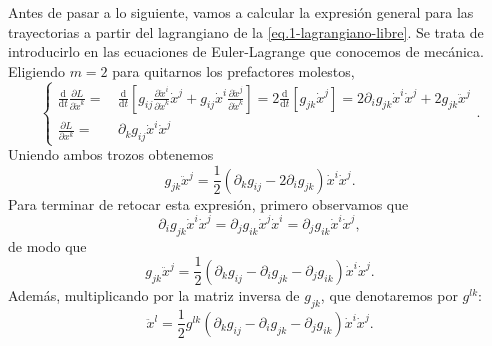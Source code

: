 Antes de pasar a lo siguiente, vamos a calcular la expresión general para las trayectorias a partir del lagrangiano de la \cref{eq.1-lagrangiano-libre}. Se trata de introducirlo en las ecuaciones de Euler-Lagrange que conocemos de mecánica. Eligiendo \(m = 2\) para quitarnos los prefactores molestos,
\begin{equation*}
    \left\{
        \begin{aligned}
            \frac{\mathrm{d}}{\mathrm{d}t}\frac{\partial L}{\partial \dot{x}^{k}} =&\, 
            \frac{\mathrm{d}}{\mathrm{d}t} \left[g_{ij} \frac{\partial \dot{x}^i}{\partial \dot{x}^k} \dot{x}^j +  g_{ij} \dot{x}^i\frac{\partial \dot{x}^j}{\partial \dot{x}^k} \right] = 2\frac{\mathrm{d}}{\mathrm{d}t} \left[g_{jk} \dot{x}^j\right]
            = 2 \partial_i g_{jk} \dot{x}^i \dot{x}^j + 2 g_{jk} \ddot{x}^j\\
            \frac{\partial L}{\partial x^k} =&\, \partial_{k}g_{ij}\dot{x}^i\dot{x}^j
        \end{aligned}
    \right..
\end{equation*}
Uniendo ambos trozos obtenemos
\begin{equation}
    g_{jk} \ddot{x}^j = \frac{1}{2}\left(\partial_{k}g_{ij} - 2 \partial_i g_{jk}\right)\dot{x}^i\dot{x}^j.
\end{equation}
Para terminar de retocar esta expresión, primero observamos que 
\begin{equation*}
    \partial_i g_{jk}\dot{x}^i\dot{x}^j = \partial_j g_{ik}\dot{x}^j\dot{x}^i = \partial_j g_{ik}\dot{x}^i\dot{x}^j, 
\end{equation*}
de modo que
\begin{equation*}
    g_{jk} \ddot{x}^j = \frac{1}{2}\left(\partial_{k}g_{ij} - \partial_i g_{jk} - \partial_j g_{ik}\right)\dot{x}^i\dot{x}^j.
\end{equation*}
Además, multiplicando por la matriz inversa de \(g_{jk}\), que denotaremos por \(g^{lk}\):
\begin{equation}
    \label{eq.1-newton_christoffel}
    \ddot{x}^l = \frac{1}{2}g^{lk}\left(\partial_{k}g_{ij} - \partial_i g_{jk} - \partial_j g_{ik}\right)\dot{x}^i\dot{x}^j.
\end{equation}

